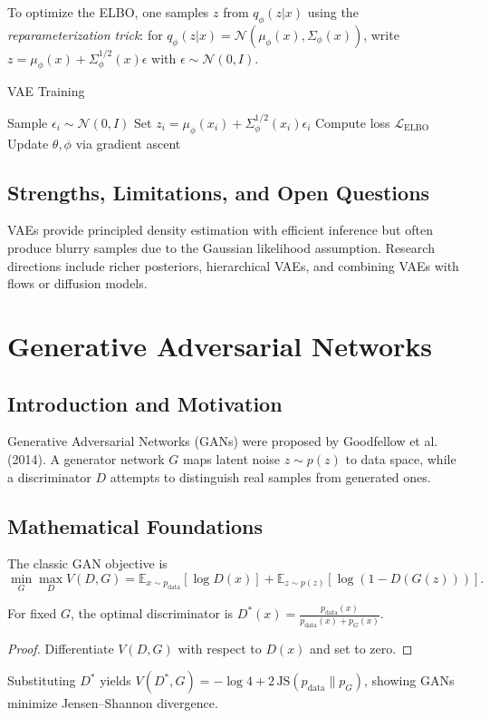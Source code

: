 To optimize the ELBO, one samples $z$ from $q_\phi(z|x)$ using the \emph{reparameterization trick}: for $q_\phi(z|x)=\mathcal{N}(\mu_\phi(x),\Sigma_\phi(x))$, write $z=\mu_\phi(x)+\Sigma_\phi^{1/2}(x)\epsilon$ with $\epsilon\sim\mathcal{N}(0,I)$.

\begin{algorithm}
\caption{VAE Training}
\begin{algorithmic}[1]
    \STATE Sample $\epsilon_i\sim\mathcal{N}(0,I)$
    \STATE Set $z_i=\mu_\phi(x_i)+\Sigma_\phi^{1/2}(x_i)\epsilon_i$
    \STATE Compute loss $\mathcal{L}_{\text{ELBO}}$
    \STATE Update $\theta,\phi$ via gradient ascent
\ENDFOR
\end{algorithmic}
\end{algorithm}

\subsection{Strengths, Limitations, and Open Questions}
VAEs provide principled density estimation with efficient inference but often produce blurry samples due to the Gaussian likelihood assumption. Research directions include richer posteriors, hierarchical VAEs, and combining VAEs with flows or diffusion models.

\section{Generative Adversarial Networks}
\subsection{Introduction and Motivation}
Generative Adversarial Networks (GANs) were proposed by Goodfellow et al. (2014). A generator network $G$ maps latent noise $z\sim p(z)$ to data space, while a discriminator $D$ attempts to distinguish real samples from generated ones.

\subsection{Mathematical Foundations}
The classic GAN objective is
\begin{equation}
\min_G \max_D V(D,G) = \mathbb{E}_{x\sim p_{\text{data}}} [\log D(x)] + \mathbb{E}_{z\sim p(z)} [\log(1-D(G(z)))].
\end{equation}

\begin{theorem}
For fixed $G$, the optimal discriminator is $D^*(x)=\frac{p_{\text{data}}(x)}{p_{\text{data}}(x)+p_G(x)}$.
\end{theorem}
\begin{proof}
Differentiate $V(D,G)$ with respect to $D(x)$ and set to zero.
\end{proof}
Substituting $D^*$ yields $V(D^*,G)= -\log 4 + 2\,\text{JS}(p_{\text{data}}\|p_G)$, showing GANs minimize Jensen--Shannon divergence.

